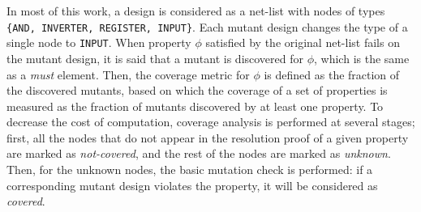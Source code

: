 In most of this work, a design is considered as a net-list with nodes of types {\small \texttt{\{AND, INVERTER, REGISTER, INPUT\}}}.
Each mutant design changes the type of a single node to {\small \texttt{INPUT}}. When property $\phi$ satisfied by the original net-list fails on the mutant design, it is said that a mutant is discovered for $\phi$, which is the same as a \emph{must} element. Then, the coverage metric for $\phi$ is defined as the fraction of the discovered mutants, based on which the coverage of a set of properties is measured as the fraction of mutants discovered by at least one property. To decrease the cost of computation, coverage analysis is performed at several stages; first, all the nodes that do not appear in the resolution proof of a given property are marked as \emph{not-covered}, and the rest of the nodes are marked as \emph{unknown}. Then, for the unknown nodes, the basic mutation check is performed: if a corresponding mutant design violates the property, it will be considered as \emph{covered}.



%
%
%

